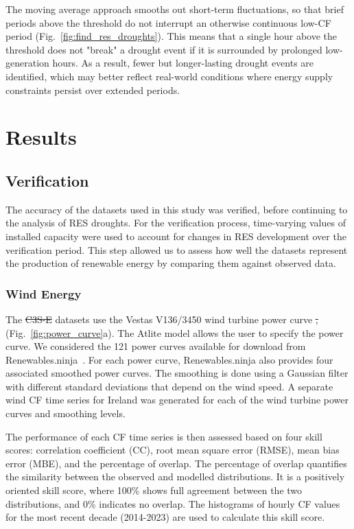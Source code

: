 \documentclass[preprint, 12pt]{elsarticle}
\providecommand{\DIFadd}[1]{{\protect\color{blue}\uwave{#1}}} %
\providecommand{\DIFdel}[1]{{\protect\color{red}\sout{#1}}}                      %
\providecommand{\DIFaddbegin}{} %
\providecommand{\DIFaddend}{} %
\providecommand{\DIFdelbegin}{} %
\providecommand{\DIFdelend}{} %
\begin{document}
The moving average approach smooths out short-term fluctuations, so that brief periods above the threshold do not interrupt an otherwise continuous low-CF period (Fig.~\ref{fig:find_res_droughts}). This means that a single hour above the threshold does not "break" a drought event if it is surrounded by prolonged low-generation hours. As a result, fewer but longer-lasting drought events are identified, which may better reflect real-world conditions where energy supply constraints persist over extended periods.

\section{Results}
\DIFdelbegin %
\DIFdelend \DIFaddbegin \label{sec:results}
\DIFaddend 

\subsection{Verification}
\label{sec:verification}

The accuracy of the datasets used in this study was verified, before continuing to the analysis of RES droughts. For the verification process, time-varying values of installed capacity were used to account for changes in RES development over the verification period. This step allowed us to assess how well the datasets represent the production of renewable energy by comparing them against observed data.

\subsubsection{Wind Energy}
\label{sec:wind_verification}

The \DIFdelbegin \DIFdel{C3S-E }\DIFdelend \DIFaddbegin \DIFadd{C3S }\DIFaddend datasets use the Vestas V136/3450 wind turbine power curve \DIFdelbegin \DIFdel{, }\DIFdelend (Fig.~\ref{fig:power_curve}a). The Atlite model allows the user to specify the power curve. We considered the 121 power curves available for download from Renewables.ninja~\citep{staffell2016wake}. For each power curve, Renewables.ninja also provides four associated smoothed power curves. The smoothing is done using a Gaussian filter with different standard deviations that depend on the wind speed. A separate wind CF time series for Ireland was generated for each of the wind turbine power curves and smoothing levels.

The performance of each CF time series is then assessed based on four skill scores: correlation coefficient (CC), root mean square error (RMSE), mean bias error (MBE), and the percentage of overlap. The percentage of overlap quantifies the similarity between the observed and modelled distributions. It is a positively oriented skill score, where 100\% shows full agreement between the two distributions, and 0\% indicates no overlap. The histograms of hourly CF values for the most recent decade (2014-2023) are used to calculate this skill score.
\end{document}
